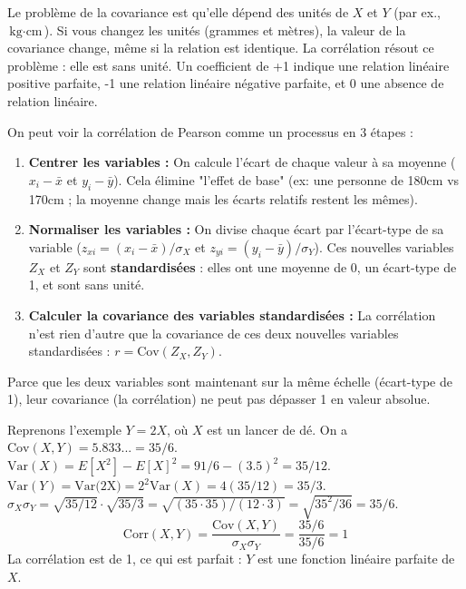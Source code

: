 \begin{intuitionbox}
Le problème de la covariance est qu'elle dépend des unités de $X$ et $Y$ (par ex., $\text{kg} \cdot \text{cm}$). Si vous changez les unités (grammes et mètres), la valeur de la covariance change, même si la relation est identique. La corrélation résout ce problème : elle est sans unité. Un coefficient de +1 indique une relation linéaire positive parfaite, -1 une relation linéaire négative parfaite, et 0 une absence de relation linéaire.
\end{intuitionbox}

\begin{intuitionbox}
On peut voir la corrélation de Pearson comme un processus en 3 étapes :
\begin{enumerate}
    \item \textbf{Centrer les variables :} On calcule l'écart de chaque valeur à sa moyenne ($x_i - \bar{x}$ et $y_i - \bar{y}$). Cela élimine "l'effet de base" (ex: une personne de 180cm vs 170cm ; la moyenne change mais les écarts relatifs restent les mêmes).
    \item \textbf{Normaliser les variables :} On divise chaque écart par l'écart-type de sa variable ($z_{xi} = (x_i - \bar{x})/\sigma_X$ et $z_{yi} = (y_i - \bar{y})/\sigma_Y$). Ces nouvelles variables $Z_X$ et $Z_Y$ sont \textbf{standardisées} : elles ont une moyenne de 0, un écart-type de 1, et sont sans unité.
    \item \textbf{Calculer la covariance des variables standardisées :} La corrélation n'est rien d'autre que la covariance de ces deux nouvelles variables standardisées : $r = \text{Cov}(Z_X, Z_Y)$.
\end{enumerate}
Parce que les deux variables sont maintenant sur la même échelle (écart-type de 1), leur covariance (la corrélation) ne peut pas dépasser 1 en valeur absolue.
\end{intuitionbox}

\begin{examplebox}
Reprenons l'exemple $Y=2X$, où $X$ est un lancer de dé.
On a $\text{Cov}(X,Y) = 5.833... = 35/6$.
$\text{Var}(X) = E[X^2] - E[X]^2 = 91/6 - (3.5)^2 = 35/12$.
$\text{Var}(Y) = \text{Var(2X)} = 2^2 \text{Var}(X) = 4(35/12) = 35/3$.
$\sigma_X \sigma_Y = \sqrt{35/12} \cdot \sqrt{35/3} = \sqrt{(35 \cdot 35) / (12 \cdot 3)} = \sqrt{35^2 / 36} = 35/6$.
$$ \text{Corr}(X,Y) = \frac{\text{Cov}(X,Y)}{\sigma_X \sigma_Y} = \frac{35/6}{35/6} = 1 $$
La corrélation est de 1, ce qui est parfait : $Y$ est une fonction linéaire parfaite de $X$.
\end{examplebox}

